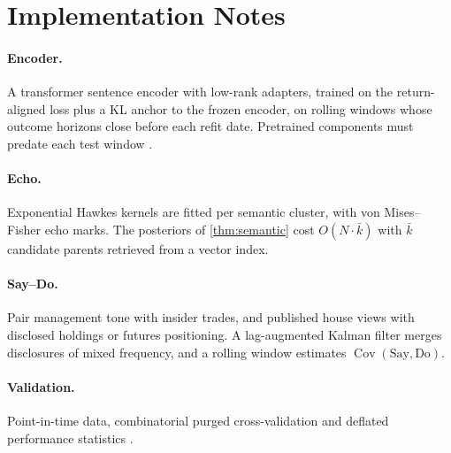 \documentclass{article}
\theoremstyle{plain}
\theoremstyle{definition}
\theoremstyle{remark}
\DeclareMathOperator{\Cov}{Cov}
\begin{document}
\section{Implementation Notes}\label{app:impl}

\paragraph{Encoder.} A transformer sentence encoder \citep{reimers2019} with low-rank adapters, trained on the return-aligned loss plus a KL anchor to the frozen encoder, on rolling windows whose outcome horizons close before each refit date. Pretrained components must predate each test window \citep{glasserman2023}.

\paragraph{Echo.} Exponential Hawkes kernels are fitted per semantic cluster, with von Mises--Fisher echo marks. The posteriors of \cref{thm:semantic} cost $O(N\cdot\bar k)$ with $\bar k$ candidate parents retrieved from a vector index.

\paragraph{Say--Do.} Pair management tone with insider trades, and published house views with disclosed holdings or futures positioning. A lag-augmented Kalman filter merges disclosures of mixed frequency, and a rolling window estimates $\Cov(\text{Say},\text{Do})$.

\paragraph{Validation.} Point-in-time data, combinatorial purged cross-validation and deflated performance statistics \citep{lopezdeprado2018,bailey2014dsr}.
\end{document}
